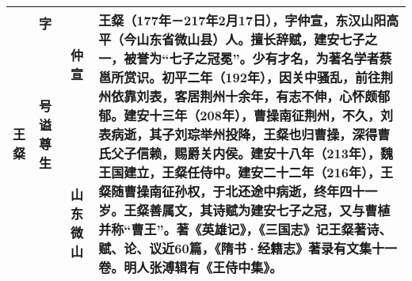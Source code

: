 \begin{longtable}{|>{\centering\namefont\heiti}m{2em}|>{\centering\tiny}m{3.0em}|>{\xzfont\kaiti}m{7.3em}|}
    王粲 & \begin{description}
    \item[字] 仲宣
    \item[号] 
    \item[谥] 
    \item[尊] 
    \item[生] 山东微山
    \end{description} & 王粲（177年－217年2月17日），字仲宣，东汉山阳高平（今山东省微山县）人。擅长辞赋，建安七子之一，被誉为“七子之冠冕”。少有才名，为著名学者蔡邕所赏识。初平二年（192年），因关中骚乱，前往荆州依靠刘表，客居荆州十余年，有志不伸，心怀颇郁郁。建安十三年（208年），曹操南征荆州，不久，刘表病逝，其子刘琮举州投降，王粲也归曹操，深得曹氏父子信赖，赐爵关内侯。建安十八年（213年），魏王国建立，王粲任侍中。建安二十二年（216年），王粲随曹操南征孙权，于北还途中病逝，终年四十一岁。王粲善属文，其诗赋为建安七子之冠，又与曹植并称“曹王”。著《英雄记》，《三国志》记王粲著诗、赋、论、议近60篇，《隋书·经籍志》著录有文集十一卷。明人张溥辑有《王侍中集》。 \tabularnewline\hline

    \bottomrule
\end{longtable}


